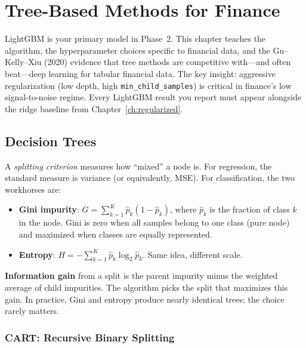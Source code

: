 \chapter{Tree-Based Methods for Finance}
\label{ch:trees}

\begin{projectconnection}
LightGBM is your primary model in Phase~2.
This chapter teaches the algorithm, the hyperparameter choices specific to financial data, and the Gu--Kelly--Xiu (2020) evidence that tree methods are competitive with---and often beat---deep learning for tabular financial data.
The key insight: aggressive regularization (low depth, high \texttt{min\_child\_samples}) is critical in finance's low signal-to-noise regime.
Every LightGBM result you report must appear alongside the ridge baseline from Chapter~\ref{ch:regularized}.
\end{projectconnection}

\section{Decision Trees}
\label{sec:decision-trees}

\begin{prereq}
A \emph{splitting criterion} measures how ``mixed'' a node is.
For regression, the standard measure is variance (or equivalently, MSE).
For classification, the two workhorses are:
\begin{itemize}[nosep]
  \item \textbf{Gini impurity}: $G = \sum_{k=1}^K \hat{p}_k (1 - \hat{p}_k)$, where $\hat{p}_k$ is the fraction of class $k$ in the node. Gini is zero when all samples belong to one class (pure node) and maximized when classes are equally represented.
  \item \textbf{Entropy}: $H = -\sum_{k=1}^K \hat{p}_k \log_2 \hat{p}_k$. Same idea, different scale.
\end{itemize}
\textbf{Information gain} from a split is the parent impurity minus the weighted average of child impurities.
The algorithm picks the split that maximizes this gain.
In practice, Gini and entropy produce nearly identical trees; the choice rarely matters.
\end{prereq}

\subsection{CART: Recursive Binary Splitting}

